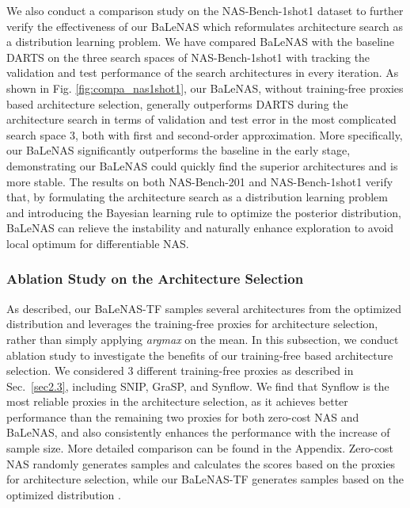 \documentclass[10pt,twocolumn,letterpaper]{article}
\begin{document}
We also conduct a comparison study on the NAS-Bench-1shot1 dataset to further verify the effectiveness of our BaLeNAS which reformulates architecture search as a distribution learning problem. We have compared BaLeNAS with the baseline DARTS on the three search spaces of NAS-Bench-1shot1 with tracking the validation and test performance of the search architectures in every iteration. As shown in Fig. \ref{fig:compa_nas1shot1}, our BaLeNAS, without training-free proxies based architecture selection, generally outperforms DARTS during the architecture search in terms of validation and test error in the most complicated search space 3, both with first and second-order approximation. More specifically, our BaLeNAS significantly outperforms the baseline in the early stage, demonstrating our BaLeNAS could quickly find the superior architectures and is more stable. The results on both NAS-Bench-201 and NAS-Bench-1shot1 verify that, by formulating the architecture search as a distribution learning problem and introducing the Bayesian learning rule to optimize the posterior distribution, BaLeNAS can relieve the instability and naturally enhance exploration to avoid local optimum for differentiable NAS. 


\vspace{-1em}
\subsubsection{Ablation Study on the Architecture Selection}

As described, our BaLeNAS-TF samples several architectures from the optimized distribution and leverages the training-free proxies for architecture selection, rather than simply applying \textit{argmax} on the mean. In this subsection, we conduct ablation study to investigate the benefits of our training-free based architecture selection. We considered 3 different training-free proxies as described in Sec.~\ref{sec2.3}, including SNIP, GraSP, and Synflow. We find that Synflow is the most reliable proxies in the architecture selection, as it achieves better performance than the remaining two proxies for both zero-cost NAS and BaLeNAS, and also consistently enhances the performance with the increase of sample size. More detailed comparison can be found in the Appendix. Zero-cost NAS \cite{abdelfattah2021zero} randomly generates samples and calculates the scores based on the proxies for architecture selection, while our BaLeNAS-TF generates samples based on the optimized distribution . 
\end{document}
